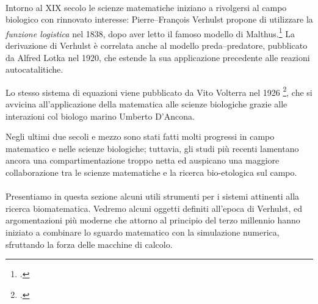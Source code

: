 \paragraph{}
Intorno al XIX secolo le scienze matematiche iniziano a rivolgersi al campo biologico con rinnovato interesse:
Pierre--François Verhulst propone di utilizzare la \emph{funzione logistica} nel 1838, dopo aver letto il famoso
modello di Malthus.\footcite{malthus1986essay}
La derivazione di Verhulst è correlata anche al modello preda--predatore, pubblicato da Alfred
Lotka nel 1920, che estende la sua applicazione precedente alle reazioni autocatalitiche.

Lo stesso sistema di equazioni viene pubblicato da Vito Volterra nel 1926
\footcite{vito},
che si avvicina all'applicazione della matematica alle scienze biologiche grazie alle interazioni col
biologo marino Umberto D'Ancona.

Negli ultimi due secoli e mezzo sono stati fatti molti progressi in campo matematico e nelle scienze biologiche;
tuttavia, gli studi più recenti lamentano ancora una compartimentazione troppo netta ed auspicano una maggiore
collaborazione tra le scienze matematiche e la ricerca bio-etologica sul campo.

\paragraph{}
Presentiamo in questa sezione alcuni utili strumenti per i sistemi attinenti alla ricerca biomatematica.
Vedremo alcuni oggetti definiti all'epoca di Verhulst, ed argomentazioni più moderne che attorno al principio
del terzo millennio hanno iniziato a combinare lo sguardo matematico con la simulazione numerica,
sfruttando la forza delle macchine di calcolo.





